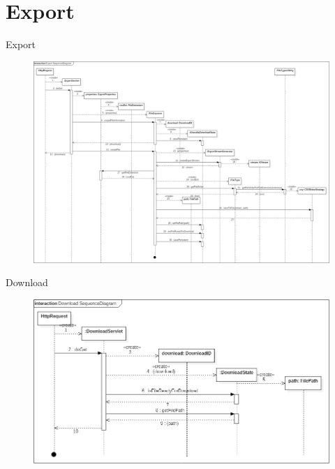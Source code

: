 \section{Export}
Export
\begin{figure}[!hbp]
	\centering
	\includegraphics[width=\linewidth]{images/export/ExportSequenceDiagram.png}
\end{figure}
\newpage
Download
\begin{figure}[!hbp]
	\centering
	\includegraphics[width=\linewidth]{images/export/DownloadSequenceDiagram.png}
\end{figure}
